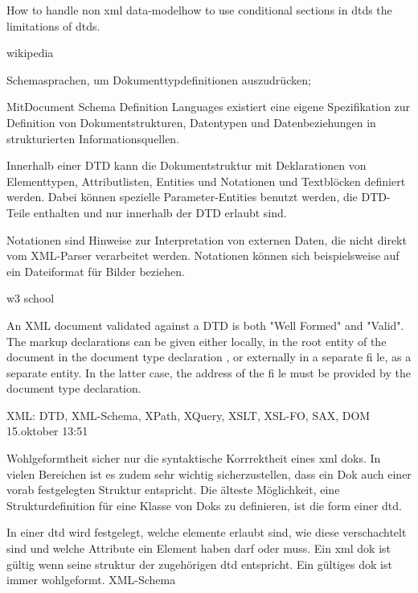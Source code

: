 How to handle non xml data-modelhow to use conditional sections in dtds the limitations of dtds.


wikipedia

Schemasprachen, um Dokumenttypdefinitionen auszudrücken;

MitDocument Schema Definition Languages existiert eine eigene Spezifikation zur Definition von Dokumentstrukturen, Datentypen und Datenbeziehungen in strukturierten Informationsquellen.

Innerhalb einer DTD kann die Dokumentstruktur mit Deklarationen von Elementtypen, Attributlisten, Entities und Notationen und Textblöcken definiert werden. Dabei können spezielle Parameter-Entities benutzt werden, die DTD-Teile enthalten und nur innerhalb der DTD erlaubt sind.

Notationen sind Hinweise zur Interpretation von externen Daten, die nicht direkt vom XML-Parser verarbeitet werden. Notationen können sich beispielsweise auf ein Dateiformat für Bilder beziehen.


w3 school

An XML document validated against a DTD is both "Well Formed" and "Valid".  The markup declarations can be given either locally, in the root entity of the document in the document type declaration , or externally in a separate fi le, as a separate entity. In the latter case, the address of the fi le must be provided by the document type declaration.


XML: DTD, XML-Schema, XPath, XQuery, XSLT, XSL-FO, SAX, DOM 15.oktober 13:51

Wohlgeformtheit sicher nur die syntaktische Korrrektheit eines xml doks. In vielen Bereichen ist es zudem sehr wichtig sicherzustellen, dass ein Dok auch einer vorab festgelegten Struktur entspricht. Die älteste Möglichkeit, eine Strukturdefinition für eine Klasse von Doks zu definieren, ist die form einer dtd.

In einer dtd wird festgelegt, welche elemente erlaubt sind, wie diese verschachtelt sind und welche Attribute ein Element haben darf oder muss. Ein xml dok ist gültig wenn seine struktur der zugehörigen dtd entspricht. Ein gültiges dok ist immer wohlgeformt.
XML-Schema


